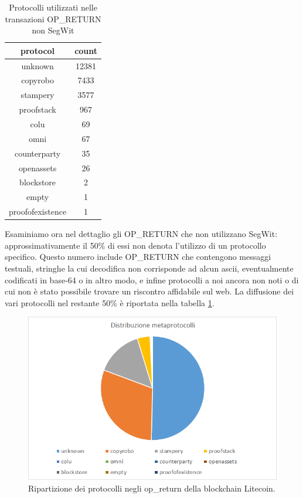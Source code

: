 \begin{table}
	\begin{center}
		\begin{tabular}{|c|c|}
			\hline 
			\textbf{protocol}& \textbf{count}  \\ 
			\hline 
		unknown	&  12381\\ 
			\hline 
		copyrobo	&  7433\\ 
			\hline 
		stampery	& 3577 \\ 
			\hline 
		proofstack	& 967 \\ 
			\hline 
		colu	& 69 \\ 
			\hline 
		omni	& 67 \\ 
			\hline 
		counterparty	& 35 \\ 
			\hline 
		openassets	& 26 \\ 
			\hline 
		blockstore	& 2 \\ 
			\hline 
		empty	& 1 \\ 
			\hline 
		proofofexistence	& 1 \\ 
			\hline 
		\end{tabular}
		\caption{Protocolli utilizzati nelle transazioni OP\_RETURN non SegWit}
		\label{protocols}
	\end{center}
\end{table}

Esaminiamo ora nel dettaglio gli OP\_RETURN che non utilizzano SegWit: approssimativamente il 50\% di essi non denota l’utilizzo di un protocollo specifico. Questo numero include OP\_RETURN che contengono messaggi testuali, stringhe la cui decodifica non corrisponde ad alcun ascii, eventualmente codificati in base-64 o in altro modo, e infine protocolli a noi ancora non noti o di cui non è stato possibile trovare un riscontro affidabile sul web.
La diffusione dei vari protocolli nel restante 50\% è riportata nella tabella \ref{protocols}.

\begin{figure}
	\centering
	\includegraphics[width=1.0\linewidth]{images/distribuzioneopreturn}
	\caption{Ripartizione dei protocolli negli op\_return della blockchain Litecoin.}
	\label{fig:distribuzioneopreturn}
\end{figure}

